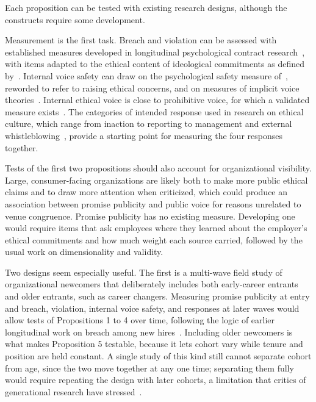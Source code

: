 \documentclass[12pt,a4paper]{article}
\theoremstyle{definition}
\begin{document}
Each proposition can be tested with existing research designs, although the constructs require some development.

Measurement is the first task. Breach and violation can be assessed with established measures developed in longitudinal psychological contract research~\citep{robinson2000development}, with items adapted to the ethical content of ideological commitments as defined by~\citet{thompson2003violations}. Internal voice safety can draw on the psychological safety measure of~\citet{edmondson1999psychological}, reworded to refer to raising ethical concerns, and on measures of implicit voice theories~\citep{detert2011implicit}. Internal ethical voice is close to prohibitive voice, for which a validated measure exists~\citep{liang2012psychological}. The categories of intended response used in research on ethical culture, which range from inaction to reporting to management and external whistleblowing~\citep{kaptein2011inaction}, provide a starting point for measuring the four responses together.

Tests of the first two propositions should also account for organizational visibility. Large, consumer-facing organizations are likely both to make more public ethical claims and to draw more attention when criticized, which could produce an association between promise publicity and public voice for reasons unrelated to venue congruence. Promise publicity has no existing measure. Developing one would require items that ask employees where they learned about the employer's ethical commitments and how much weight each source carried, followed by the usual work on dimensionality and validity.

Two designs seem especially useful. The first is a multi-wave field study of organizational newcomers that deliberately includes both early-career entrants and older entrants, such as career changers. Measuring promise publicity at entry and breach, violation, internal voice safety, and responses at later waves would allow tests of Propositions 1 to 4 over time, following the logic of earlier longitudinal work on breach among new hires~\citep{robinson2000development}. Including older newcomers is what makes Proposition 5 testable, because it lets cohort vary while tenure and position are held constant. A single study of this kind still cannot separate cohort from age, since the two move together at any one time; separating them fully would require repeating the design with later cohorts, a limitation that critics of generational research have stressed~\citep{parry2011generational,rudolph2021generations}.
\end{document}

